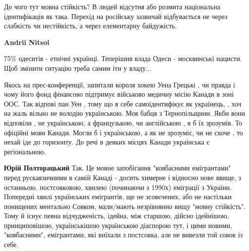 \begin{itemize}
\begin{itemize}
До чого тут мовна стійкість? В людей відсутня або розмита національна
ідентифікація як така. Перехід на російську зазвичай відбувається не через
слабкість чи нестійкість, а через елементарну байдужість.


 
\textbf{Andrii Nitsoi} 

75\% одеситів - етнічні українці. Теперішня влада Одеси - москвинські нацисти.
Щоб змінити ситуацію треба самим іти у владу...
\end{itemize}

 

Якось на прес-конференції, запитали короля хокею Уена Грецькі , чи правда і
чому його фонд фінансово підтримує військово медичну місію Канади в зоні
ООС. Так відпові пан Уен , тому що я себе самоідентифікує як українець, , хоч на
жаль вільно не володію українською. Моя бабця з Тернопільщини. Якби вони
відповіли , не українською, а французькою, чи англійською , я б їх зрозумів. То
офіційні мови Канади. Могли б і українською, а як не зрозуміє, чи не схоче , то
нехай іде до горизонту. До речі в деяких місцях Канади українська є
регіональною.

\begin{itemize}
 
\textbf{Юрій Полторацький} Так. Це мовне запобігання "ковбасними емігрантами"
перед рускаязичними в самій Канаді - досить химерне і відносно нове явище, з
останньою, постсовковою, хвилею (починаючи з 1990х) еміграції з України.
Попередні хвилі українських емігрантів, ще не зсовєчених, або не настільки
понищених ментально Совком, мали/мають незрівнянно вищу "мовну стійкість". Тому
й існує певна відчудженість, ідейна, між старшою, дійсно ідейнішою,
принциповішою, українськішою українською діаспорою тут, і цими новими,
"ковбасними", емігрантами, які виїхали з постсовка, але не вивезли той совок із
себе.
\end{itemize}


\end{itemize}
